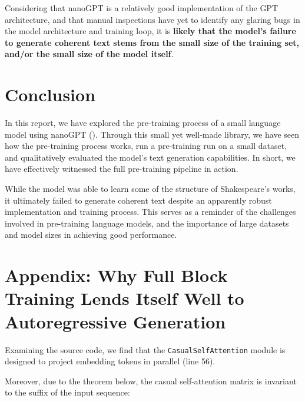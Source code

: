 \documentclass{article} %
\theoremstyle{definition}
\begin{document}
Considering that nanoGPT is a relatively good implementation of the GPT architecture,
and that manual inspections have yet to identify any glaring bugs in the model architecture
and training loop, it is \textbf{likely that the model's failure to generate coherent text
stems from the small size of the training set, and/or the small size of the model itself}.

\section{Conclusion}
In this report, we have explored the pre-training process of a small language model
using nanoGPT (\cite{nanoGPT}). Through this small yet well-made library, 
we have seen how the pre-training process works,
run a pre-training run on a small dataset,
and qualitatively evaluated the model's text generation capabilities.
In short, we have effectively witnessed the full pre-training pipeline in action.

While the model was able to learn some of the structure of Shakespeare's works,
it ultimately failed to generate coherent text despite an apparently robust implementation
and training process.
This serves as a reminder of the challenges involved in pre-training language models,
and the importance of large datasets and model sizes in achieving good performance.




\appendix

\section{Appendix: Why Full Block Training Lends Itself Well to Autoregressive Generation}
\label{sec:appendix_autoregressive}

Examining the source code, we find that the \texttt{CasualSelfAttention}
module is designed to project embedding tokens in parallel (line 56).

Moreover, due to the theorem below, the casual self-attention matrix 
is invariant to the suffix of the input sequence:
\end{document}
